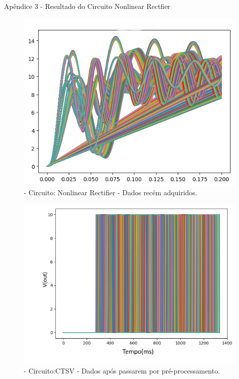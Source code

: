     
    
    
    
    
    \newpage
    Apêndice 3 - Resultado do Circuito Nonlinear Rectfier
    
    
    
      \begin{figure}[H]
        \begin{center}
        \includegraphics[width=13cm]{./01_Pre_textuais/nonlin_figs/brutosNon.png}
        \caption{\label{fig:dadoBrutoPAA}- Circuito: Nonlinear Rectifier - Dados recém adquiridos.}
        \end{center}
        \end{figure}
        
        \begin{figure}[H]
        \begin{center}
        \includegraphics[width=13cm]{./01_Pre_textuais/nonlin_figs/dadosPreProc_Nonlinear_Rectfier_+_4bit_PRBS_[FALHA]_-_300_-_02sraw.png}
        \caption{\label{fig:dadoPAA}- Circuito:CTSV - Dados após passarem por pré-processamento.}
        \end{center}
        \end{figure}
        
